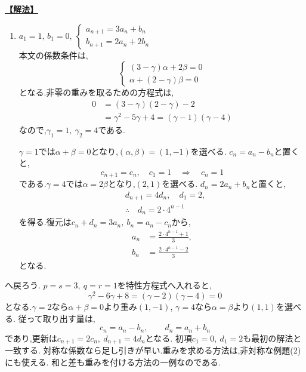 \noindent \hyperlink{book:example-system-1:problem:2}{\textbf{【解法】}}\par\nobreak
\begin{enumerate}[start=2,label=(\arabic*),parsep=3pt,format=\bookitemlink{example-system-1}{solution}{problem}]
  \item $\displaystyle a_1=1,\,b_1=0,\ \begin{cases}a_{n+1}=3a_n+b_n\\ b_{n+1}=2a_n+2b_n\end{cases}$\\
    本文の係数条件は,
    \[
      \begin{cases}
        (3-\gamma)\alpha+2\beta=0\\
        \alpha+(2-\gamma)\beta=0
      \end{cases}
    \]
    となる.非零の重みを取るための方程式は,
    \begin{align*}
      0&=(3-\gamma)(2-\gamma)-2\\
      &=\gamma^2-5\gamma+4=(\gamma-1)(\gamma-4)
    \end{align*}
    なので,$\gamma_1=1,\ \gamma_2=4$である.

    $\gamma=1$では$\alpha+\beta=0$となり,$(\alpha,\beta)=(1,-1)$を選べる.
    $c_n=a_n-b_n$と置くと,
    \[
      c_{n+1}=c_n,\quad c_1=1
      \quad\Longrightarrow\quad c_n=1
    \]
    である.$\gamma=4$では$\alpha=2\beta$となり,$(2,1)$を選べる.
    $d_n=2a_n+b_n$と置くと,
    \[
      \begin{aligned}
        &d_{n+1}=4d_n,\quad d_1=2,\\
        &\therefore\quad d_n=2\cdot4^{n-1}
      \end{aligned}
    \]
    を得る.復元は$c_n+d_n=3a_n,\ b_n=a_n-c_n$から,
    \begin{align*}
      a_n&=\frac{2\cdot4^{n-1}+1}{3},\\
      b_n&=\frac{2\cdot4^{n-1}-2}{3}
    \end{align*}
    となる.
\end{enumerate}

へ戻ろう.
$p=s=3,\ q=r=1$を特性方程式へ入れると,
\[
  \gamma^2-6\gamma+8=(\gamma-2)(\gamma-4)=0
\]
となる.$\gamma=2$なら$\alpha+\beta=0$より重み$(1,-1)$,
$\gamma=4$なら$\alpha=\beta$より$(1,1)$を選べる.
従って取り出す量は,
\[
  c_n=a_n-b_n,\qquad d_n=a_n+b_n
\]
であり,更新は$c_{n+1}=2c_n,\ d_{n+1}=4d_n$となる.
初項$c_1=0,\ d_1=2$も最初の解法と一致する.
対称な係数なら足し引きが早い.重みを求める方法は,非対称な例題(2)にも使える.
和と差も重みを付ける方法の一例なのである.
